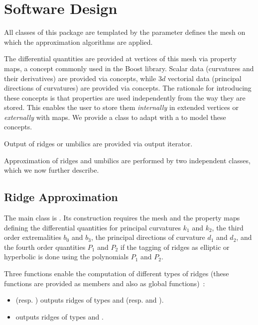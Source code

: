 \section{Software Design}
\label{soft}

All classes of this package are templated by the parameter
 defines the mesh on which the
approximation algorithms are applied.

The differential quantities are provided at vertices of this mesh via
property maps, a concept commonly used in the Boost library. Scalar
data (curvatures and their derivatives) are provided via
 concepts, while  $3d$ vectorial data (principal
directions of curvatures) are provided via
 concepts. 
The rationale for introducing these concepts is that properties are
used independently from the way they are stored. This enables the user
to store them {\em internally} in extended vertices or {\em externally}
with maps. We provide a class
 to adapt  with 
a  to model these concepts.


Output of ridges or umbilics are provided via output iterator.

Approximation of ridges and umbilics are performed by two independent
classes, which we now further describe.

\subsection{Ridge Approximation}


The main class is
.
Its construction requires the mesh and the property maps defining the
differential quantities for principal curvatures $k_1$ and $k_2$, the
third order extremalities $b_0$ and $b_3$, the principal directions of
curvature $d_1$ and $d_2$, and the fourth order quantities $P_1$ and
$P_2$ if the tagging of ridges as elliptic or hyperbolic is done using
the polynomials $P_1$ and $P_2$.


Three functions enable the computation of different types of ridges
(these functions are provided as members and also as global functions)~:
\begin{itemize}
\item {} (resp. )
  outputs ridges of types  and
   (resp.  and
  ).
\item {} outputs ridges of types
   and .
\end{itemize}

